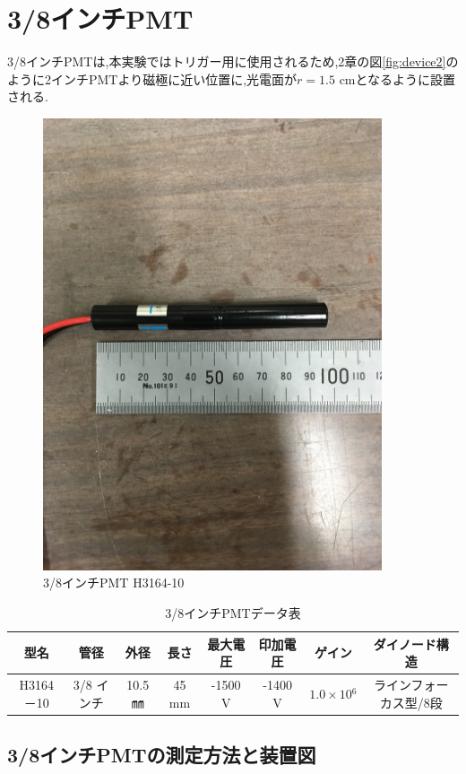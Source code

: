 \section{3/8インチPMT}
3/8インチPMT\cite{pmtH3164-10}は,本実験ではトリガー用に使用されるため,2章の図\ref{fig:device2}のように2インチPMTより磁極に近い位置に,光電面が$r=1.5$ cmとなるように設置される.

\begin{figure}[H]
	\centering
		\includegraphics[width=10cm]{fig/iguchi/miniPMT.jpg}
	\caption{3/8インチPMT H3164-10}
	\label{3/8inch}
\end{figure}

\begin{table}[h]
	\centering
	
	  \begin{tabular}{cccccccc} \hline
		型名& 管径 & 外径 & 長さ & 最大電圧 & 印加電圧 & ゲイン & ダイノード構造 \\ \hline \hline
		H3164－10 & 3/8 インチ & 10.5 ㎜ & 45 mm & -1500 V & -1400 V & $1.0\times10{^{6}}$ &ラインフォーカス型/8段　\\ \hline
	\end{tabular}
	  \caption{3/8インチPMTデータ表}
	  \label{3/8inchPMT}
\end{table}


\subsection{3/8インチPMTの測定方法と装置図}

